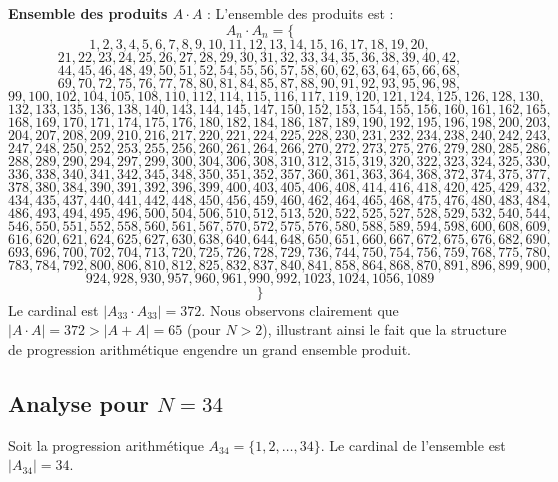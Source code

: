 \documentclass[11pt,a4paper]{article}
\begin{document}
\textbf{Ensemble des produits $A \cdot A$} :
L'ensemble des produits est :
$$ A_{{{n}}} \cdot A_{{{n}}} = \{ $$$$ 1, 2, 3, 4, 5, 6, 7, 8, 9, 10, 11, 12, 13, 14, 15, 16, 17, 18, 19, 20, $$$$ 21, 22, 23, 24, 25, 26, 27, 28, 29, 30, 31, 32, 33, 34, 35, 36, 38, 39, 40, 42, $$$$ 44, 45, 46, 48, 49, 50, 51, 52, 54, 55, 56, 57, 58, 60, 62, 63, 64, 65, 66, 68, $$$$ 69, 70, 72, 75, 76, 77, 78, 80, 81, 84, 85, 87, 88, 90, 91, 92, 93, 95, 96, 98, $$$$ 99, 100, 102, 104, 105, 108, 110, 112, 114, 115, 116, 117, 119, 120, 121, 124, 125, 126, 128, 130, $$$$ 132, 133, 135, 136, 138, 140, 143, 144, 145, 147, 150, 152, 153, 154, 155, 156, 160, 161, 162, 165, $$$$ 168, 169, 170, 171, 174, 175, 176, 180, 182, 184, 186, 187, 189, 190, 192, 195, 196, 198, 200, 203, $$$$ 204, 207, 208, 209, 210, 216, 217, 220, 221, 224, 225, 228, 230, 231, 232, 234, 238, 240, 242, 243, $$$$ 247, 248, 250, 252, 253, 255, 256, 260, 261, 264, 266, 270, 272, 273, 275, 276, 279, 280, 285, 286, $$$$ 288, 289, 290, 294, 297, 299, 300, 304, 306, 308, 310, 312, 315, 319, 320, 322, 323, 324, 325, 330, $$$$ 336, 338, 340, 341, 342, 345, 348, 350, 351, 352, 357, 360, 361, 363, 364, 368, 372, 374, 375, 377, $$$$ 378, 380, 384, 390, 391, 392, 396, 399, 400, 403, 405, 406, 408, 414, 416, 418, 420, 425, 429, 432, $$$$ 434, 435, 437, 440, 441, 442, 448, 450, 456, 459, 460, 462, 464, 465, 468, 475, 476, 480, 483, 484, $$$$ 486, 493, 494, 495, 496, 500, 504, 506, 510, 512, 513, 520, 522, 525, 527, 528, 529, 532, 540, 544, $$$$ 546, 550, 551, 552, 558, 560, 561, 567, 570, 572, 575, 576, 580, 588, 589, 594, 598, 600, 608, 609, $$$$ 616, 620, 621, 624, 625, 627, 630, 638, 640, 644, 648, 650, 651, 660, 667, 672, 675, 676, 682, 690, $$$$ 693, 696, 700, 702, 704, 713, 720, 725, 726, 728, 729, 736, 744, 750, 754, 756, 759, 768, 775, 780, $$$$ 783, 784, 792, 800, 806, 810, 812, 825, 832, 837, 840, 841, 858, 864, 868, 870, 891, 896, 899, 900, $$$$ 924, 928, 930, 957, 960, 961, 990, 992, 1023, 1024, 1056, 1089 $$$$ \} $$
Le cardinal est $|A_{33} \cdot A_{33}| = 372$.
Nous observons clairement que $|A \cdot A| = 372 > |A+A| = 65$ (pour $N > 2$), illustrant ainsi le fait que la structure de progression arithmétique engendre un grand ensemble produit.
\newpage

\subsection{Analyse pour $N = 34$}
Soit la progression arithmétique $A_{34} = \{1, 2, \dots, 34\} $. Le cardinal de l'ensemble est $|A_{34}| = 34$.
\end{document}

